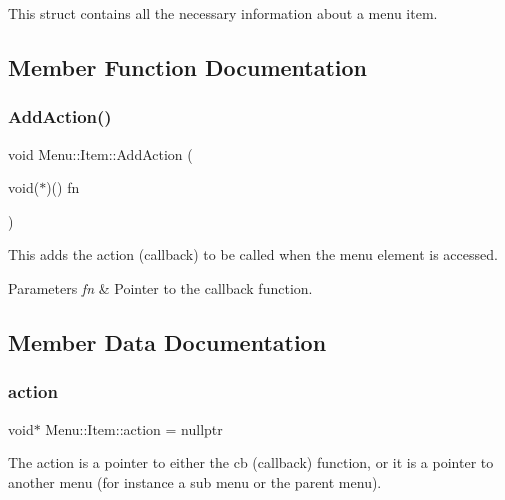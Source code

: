 This struct contains all the necessary information about a menu item. 

\subsection{Member Function Documentation}
\hypertarget{struct_menu_1_1_item_a9ae75532a76e0fdf4e9c22727280f029}{}\label{struct_menu_1_1_item_a9ae75532a76e0fdf4e9c22727280f029} 
\subsubsection{\texorpdfstring{Add\+Action()}{AddAction()}}
{\footnotesize\ttfamily void Menu\+::\+Item\+::\+Add\+Action (\begin{DoxyParamCaption}\item[{void($\ast$)()}]{fn }\end{DoxyParamCaption})}

This adds the action (callback) to be called when the menu element is accessed. 
\begin{DoxyParams}{Parameters}
{\em fn} & Pointer to the callback function. \\
\hline
\end{DoxyParams}


\subsection{Member Data Documentation}
\hypertarget{struct_menu_1_1_item_a247e140fed2addf80986ba5a3506b9dd}{}\label{struct_menu_1_1_item_a247e140fed2addf80986ba5a3506b9dd} 
\subsubsection{\texorpdfstring{action}{action}}
{\footnotesize\ttfamily void$\ast$ Menu\+::\+Item\+::action = nullptr}

The action is a pointer to either the cb (callback) function, or it is a pointer to another menu (for instance a sub menu or the parent menu). \hypertarget{struct_menu_1_1_item_a5c9895a137458b9a12dafd447ac7430b}{}\label{struct_menu_1_1_item_a5c9895a137458b9a12dafd447ac7430b} 
